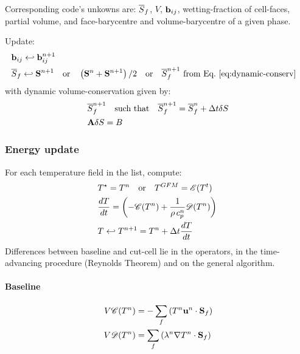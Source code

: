 \documentclass[]{article}
\begin{document}
Corresponding code's unkowns are: $\f{S}_f$, $V$, $\ve{b}_{ij}$,  wetting-fraction of cell-faces, partial volume, and face-barycentre and volume-barycentre of a given phase.

Update:
\begin{align} 
	&\ve{b}_{ij} \into \ve{b}_{ij}^{n+1} \\
	& \f{S}_f \into \ve{S}^{n+1} \qouq \lrp{\ve{S}^{n}+\ve{S}^{n+1}}/2 \qouq \f{S}_f^{n+1} \mbox{ from Eq.~\eqref{eq:dynamic-conserv}} \quad \code{  --> gp_->compute();} %
\end{align}
with dynamic volume-conservation given by:
\begin{align}
&\f{S}_f^{n+1} \quad \mbox{such that} \quad\f{S}_f^{n+1}=\f{S}_f^{n}+\Delta t \delta S
	\label{eq:dynamic-conserv} \\
	&\ve{A} \delta S = B
\end{align}

\subsubsection{Energy update}
For each temperature field in the list, compute: 
\begin{align} 
	&T^\star = T^n \qouq T^{GFM}=\mathcal{E}(T^t) 
	\code{  --> thermal_->gfm(T_);} \\
	&\frac{dT}{dt}= \lrp{-\mathcal{C}(T^{n})
		+\frac{1}{\rhoCp^n}\mathcal{D}(T^{n})}
		 \code{  --> thermal_->derivee_en_temps_inco(dT_);} \\
	&T \into T^{n+1}=T^n +\Delta t \frac{dT}{dt} \code{  --> thermal_->euler_explicit_update();} \\
\end{align}
%
Differences between baseline and cut-cell lie in the operators, in the time-advancing procedure (Reynolds Theorem) and on the general algorithm.
\paragraph{Baseline}
\begin{align}
	 V\mathcal{C}(T^{n}) &= -\sum_f \lrp{T^n \ve{u}^n \cdot\ve{S}_f}\\
	 V\mathcal{D}(T^{n}) &= \sum_f \lrp{\lambda^n \nabla T^n\cdot\ve{S}_f}
\end{align}
	
\end{document}
